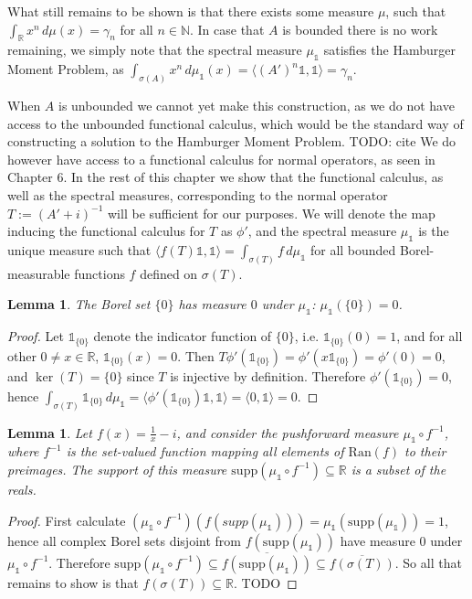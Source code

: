 \documentclass[12pt,oneside]{report}
\newtheorem{lem}[thm]{Lemma}
\begin{document}
What still remains to be shown is that there exists some measure $\mu$, such that $\int _{\mathbb{R}} x^{n} \, d\mu(x) = \gamma_{n}$ for all $n \in \mathbb{N}$. In case that $A$ is bounded there is no work remaining, we simply note that the spectral measure $\mu_{\mathds{1}}$ satisfies the Hamburger Moment Problem, as $\int _{\sigma(A)} x^{n} \, d\mu_{\mathds{1}}(x) = \langle (A')^{n}\mathds{1},\mathds{1} \rangle = \gamma_{n}$.

When $A$ is unbounded we cannot yet make this construction, as we do not have access to the unbounded functional calculus, which would be the standard way of constructing a solution to the Hamburger Moment Problem. TODO: cite We do however have access to a functional calculus for normal operators, as seen in Chapter $6$. In the rest of this chapter we show that the functional calculus, as well as the spectral measures, corresponding to the normal operator $T := (A'+i)^{-1}$ will be sufficient for our purposes. We will denote the map inducing the functional calculus for $T$ as $\phi'$, and the spectral measure $\mu_{\mathds{1}}$ is the unique measure such that $\langle f(T)\mathds{1},\mathds{1} \rangle = \int _{\sigma(T)} f \, d\mu_{\mathds{1}}$ for all bounded Borel-measurable functions $f$ defined on $\sigma(T)$.

\begin{lem}
    The Borel set $\{ 0 \}$ has measure $0$ under $\mu_{\mathds{1}}$: $\mu_{\mathds{1}}(\{ 0 \}) = 0$.
\end{lem}
\begin{proof}
    Let $\mathds{1}_{\{ 0 \}}$ denote the indicator function of $\{ 0 \}$, i.e. $\mathds{1}_{\{ 0 \}}(0) = 1$, and for all other $0 \neq x \in \mathbb{R}$, $\mathds{1}_{\{ 0 \}}(x) = 0$. Then $T\phi'(\mathds{1}_{\{ 0 \}}) = \phi'(x\mathds{1}_{\{ 0 \}}) = \phi'(0) = 0$, and $\ker(T) = \{ 0 \}$ since $T$ is injective by definition. Therefore $\phi'(\mathds{1}_{\{ 0 \}}) = 0$, hence $\int _{\sigma(T)} \mathds{1}_{\{ 0 \}} \, d\mu_{\mathds{1}} = \langle \phi'(\mathds{1}_{\{ 0 \}})\mathds{1}, \mathds{1} \rangle = \langle 0 , \mathds{1} \rangle = 0$.
\end{proof}

\begin{lem}\label{supp-real}
    Let $f(x) = \frac{1}{x} - i$, and consider the pushforward measure $\mu_{\mathds{1}} \circ f^{-1}$, where $f^{-1}$ is the set-valued function mapping all elements of $\mathrm{Ran}(f)$ to their preimages. The support of this measure $\mathrm{supp}(\mu_{\mathds{1}} \circ f^{-1}) \subseteq \mathbb{R}$ is a subset of the reals.
\end{lem}
\begin{proof}
    First calculate $(\mu_{\mathds{1}} \circ f^{-1})(f(supp(\mu_{\mathds{1}}))) = \mu_{\mathds{1}}(\mathrm{supp}(\mu_{\mathds{1}})) = 1$, hence all complex Borel sets disjoint from $f(\mathrm{supp}(\mu_{\mathds{1}}))$ have measure $0$ under $\mu_{\mathds{1}} \circ f^{-1}$. Therefore $\mathrm{supp}(\mu_{\mathds{1}} \circ f^{-1}) \subseteq \overline{f(\mathrm{supp}(\mu_{\mathds{1}}))} \subseteq \overline{f(\sigma(T))}$. So all that remains to show is that $f(\sigma(T)) \subseteq \mathbb{R}$. TODO
\end{proof}
\end{document}
